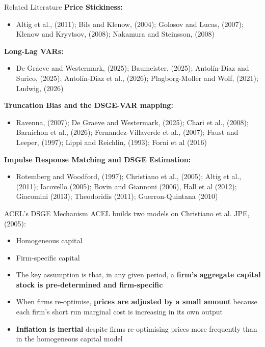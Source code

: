 \documentclass[11pt]{beamer}
\begin{document}
\begin{frame}{Related Literature}
    \textbf{Price Stickiness:}
    \begin{itemize}
        \item {\footnotesize Altig et al., (2011); Bils and Klenow, (2004); Golosov and Lucas, (2007); Klenow and Kryvtsov, (2008); Nakamura and Steinsson, (2008)}
    \end{itemize}
    \textbf{Long-Lag VARs:}
    \begin{itemize}
        \item {\footnotesize De Graeve and Westermark, (2025); Baumeister, (2025); Antolín-Díaz and Surico, (2025); Antolín-Díaz et al., (2026); Plagborg-Moller and Wolf, (2021); Ludwig, (2026)}
    \end{itemize}
    \textbf{Truncation Bias and the DSGE-VAR mapping:}
    \begin{itemize}
        \item {\footnotesize Ravenna, (2007); De Graeve and Westermark, (2025); Chari et al., (2008); Barnichon et al., (2026); Fernandez-Villaverde et al., (2007); Faust and Leeper, (1997); Lippi and Reichlin, (1993); Forni et al (2016)}
    \end{itemize}
    \textbf{Impulse Response Matching and DSGE Estimation:}
    \begin{itemize}
        \item {\footnotesize Rotemberg and Woodford, (1997); Christiano et al., (2005); Altig et al., (2011); Iacovello (2005); Bovin and Giannoni (2006), Hall et al (2012); Giacomini (2013); Theodoridis (2011); Guerron-Quintana (2010)}
    \end{itemize}
\end{frame}


\begin{frame}{ACEL's DSGE Mechanism}
    ACEL builds two models on Christiano et al. JPE, (2005):
    \begin{itemize}
        \item Homogeneous capital
        \item Firm-specific capital
    \end{itemize}
    \vspace{0.5cm}
    
    \begin{itemize}
        \item The key assumption is that, in any given period, a \textbf{firm's aggregate capital stock is pre-determined and firm-specific}
        \item When firms re-optimise, \textbf{prices are adjusted by a small amount} because each firm's short run marginal cost is increasing in its own output
        \item \textbf{Inflation is inertial} despite firms re-optimising prices more frequently than in the homogeneous capital model
    \end{itemize}    
\end{frame}
\end{document}
